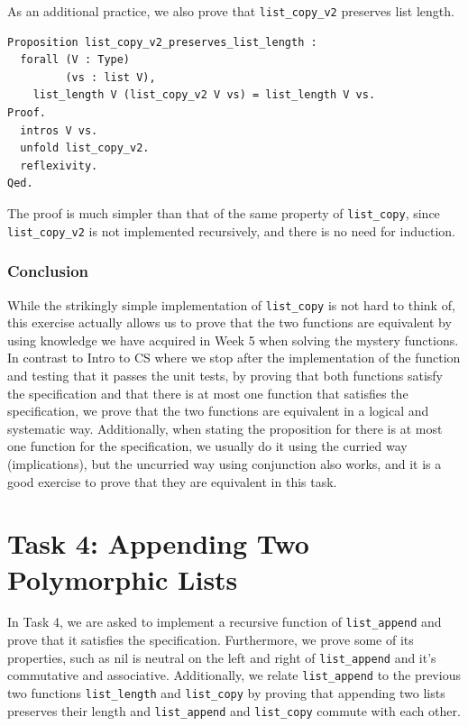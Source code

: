 \documentclass{article}
\begin{document}
As an additional practice, we also prove that \texttt{list\_copy\_v2} preserves list length.

\begin{lstlisting}
Proposition list_copy_v2_preserves_list_length :
  forall (V : Type)
         (vs : list V),
    list_length V (list_copy_v2 V vs) = list_length V vs.
Proof.
  intros V vs.
  unfold list_copy_v2.
  reflexivity.
Qed.
\end{lstlisting}

The proof is much simpler than that of the same property of \texttt{list\_copy}, since \texttt{list\_copy\_v2} is not implemented recursively, and there is no need for induction.

\subsubsection{Conclusion}
While the strikingly simple implementation of \texttt{list\_copy} is not hard to think of, this exercise actually allows us to prove that the two functions are equivalent by using knowledge we have acquired in Week 5 when solving the mystery functions. In contrast to Intro to CS where we stop after the implementation of the function and testing that it passes the unit tests, by proving that both functions satisfy the specification and that there is at most one function that satisfies the specification, we prove that the two functions are equivalent in a logical and systematic way. Additionally, when stating the proposition for there is at most one function for the specification, we usually do it using the curried way (implications), but the uncurried way using conjunction also works, and it is a good exercise to prove that they are equivalent in this task.

\newpage

\section{Task 4: Appending Two Polymorphic Lists}
In Task 4, we are asked to implement a recursive function of \texttt{list\_append} and prove that it satisfies the specification. Furthermore, we prove some of its properties, such as nil is neutral on the left and right of \texttt{list\_append} and it's commutative and associative. Additionally, we relate \texttt{list\_append} to the previous two functions \texttt{list\_length} and \texttt{list\_copy} by proving that appending two lists preserves their length and \texttt{list\_append} and \texttt{list\_copy} commute with each other.
\end{document}
